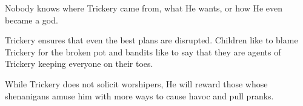 Nobody knows where Trickery came from, what He wants, or how He even became a god.

Trickery ensures that even the best plans are disrupted.
Children like to blame Trickery for the broken pot and bandits like to say that they are agents of Trickery keeping everyone on their toes.

While Trickery does not solicit worshipers, He will reward those whose shenanigans amuse him with more ways to cause havoc and pull pranks.
